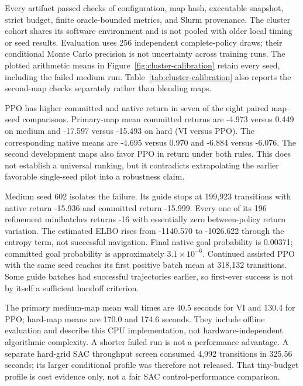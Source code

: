 Every artifact passed checks of configuration, map hash, executable snapshot,
strict budget, finite oracle-bounded metrics, and Slurm provenance. The cluster
cohort shares its software environment and is not pooled with older local
timing or seed results. Evaluation uses 256 independent complete-policy draws;
their conditional Monte Carlo precision is not uncertainty across training runs.
The plotted arithmetic means in Figure~\ref{fig:cluster-calibration} retain
every seed, including the failed medium run. Table~\ref{tab:cluster-calibration}
also reports the second-map checks separately rather than blending maps.

PPO has higher committed and native return in seven of the eight paired
map--seed comparisons. Primary-map mean committed returns are -4.973 versus
0.449 on medium and -17.597 versus -15.493 on hard (VI versus PPO).
The corresponding native means are -4.695 versus 0.970 and -6.884 versus
-6.076. The second development maps also favor PPO in return under both rules.
This does not establish a universal ranking, but it contradicts extrapolating
the earlier favorable single-seed pilot into a robustness claim.

Medium seed 602 isolates the failure. Its guide stops at 199,923 transitions
with native return -15.936 and committed return -15.999. Every one of its 196
refinement minibatches returns -16 with essentially zero between-policy return
variation. The estimated ELBO rises from -1140.570 to -1026.622 through the
entropy term, not successful navigation. Final native goal probability is
0.00371; committed goal probability is approximately $3.1\times10^{-6}$.
Continued assisted PPO with the same seed reaches its first positive batch
mean at 318,132 transitions. Some guide batches had successful trajectories
earlier, so first-ever success is not by itself a sufficient handoff criterion.

The primary medium-map mean wall times are 40.5 seconds for VI and 130.4 for
PPO; hard-map means are 170.0 and 174.6 seconds. They include offline evaluation
and describe this CPU implementation, not hardware-independent algorithmic
complexity. A shorter failed run is not a performance advantage. A separate
hard-grid SAC throughput screen consumed 4,992 transitions in 325.56 seconds;
its larger conditional profile was therefore not released. That tiny-budget
profile is cost evidence only, not a fair SAC control-performance comparison.


